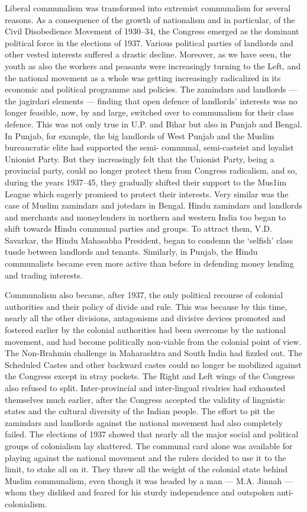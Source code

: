 \begin{multicols}{2}
Liberal communalism was transformed into extremist communalism for several reasons. As a consequence of the growth of nationalism and in particular, of the Civil Disobedience Movement of 1930--34, the Congress emerged as the dominant political force in the elections of 1937. Various political parties of landlords and other vested interests suffered a drastic decline. Moreover, as we have seen, the youth as also the workers and peasants were increasingly turning to the Left, and the national movement as a whole was getting increasingly radicalized in its economic and political programme and policies. The zamindars and landlords --- the jagirdari elements --- finding that open defence of landlords' interests was no longer feasible, now, by and large, switched over to communalism for their class defence. This was not only true in U.P. and Bihar but also in Punjab and Bengal. In Punjab, for example, the big landlords of West Punjab and the Muslim bureaucratic elite had supported the semi- communal, semi-casteist and loyalist Unionist Party. But they increasingly felt that the Unionist Party, being a provincial party, could no longer protect them from Congress radicalism, and so, during the years 1937--45, they gradually shifted their support to the Mus1im League which eagerly promised to protect their interests. Very similar was the case of Muslim zamindars and jotedars in Bengal. Hindu zamindars and landlords and merchants and moneylenders in northern and western India too began to shift towards Hindu communal parties and groups. To attract them, V.D. Savarkar, the Hindu Mahasabha President, began to condemn the `selfish' class tussle between landlords and tenants. Similarly, in Punjab, the Hindu communalists became even more active than before in defending money lending and trading interests. 

Communalism also became, after 1937, the only political recourse of colonial authorities and their policy of divide and rule. This was because by this time, nearly all the other divisions, antagonisms and divisive devices promoted and fostered earlier by the colonial authorities had been overcome by the national movement, and had become politically non-viable from the colonial point of view. The Non-Brahmin challenge in Maharashtra and South India had fizzled out. The Scheduled Castes and other backward castes could no longer be mobilized against the Congress except in stray pockets. The Right and Left wings of the Congress also refused to split. Inter-provincial and inter-lingual rivalries had exhausted themselves much earlier, after the Congress accepted the validity of linguistic states and the cultural diversity of the Indian people. The effort to pit the zamindars and landlords against the national movement had also completely failed. The elections of 1937 showed that nearly all the major social and political groups of colonialism lay shattered. The communal card alone was available for playing against the national movement and the rulers decided to use it to the limit, to stake all on it. They threw all the weight of the colonial state behind Muslim communalism, even though it was headed by a man --- M.A. Jinnah --- whom they disliked and feared for his sturdy independence and outspoken anti-colonialism. 


\end{multicols}
